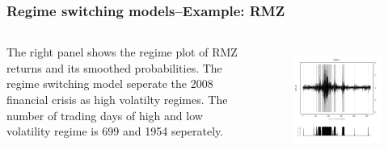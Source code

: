 \documentclass{beamer}
\newcommand\Fontviii{\fontsize{8}{9.2}\selectfont}
\begin{document}
\begin{frame}
\frametitle{Regime switching models--Example: RMZ}
\Fontviii

\begin{columns}[c] %

The right panel shows the regime plot of RMZ returns and its smoothed probabilities. The regime switching model seperate the 2008 financial crisis as high volatilty regimes. The number of trading days of high and low volatility regime is 699 and 1954 seperately.

\begin{figure}[h]
\centering 
\includegraphics[width=1\textwidth]{../results/regime/RMZ}
\label{fig: RMZregime}
\end{figure}
\end{columns}

\end{frame}
\end{document}
